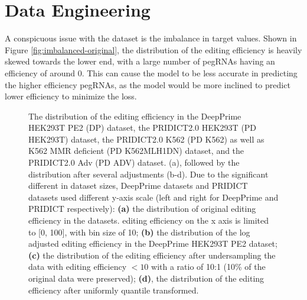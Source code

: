 \section{Data Engineering}
\label{sec:data-engineering}

A conspicuous issue with the dataset is the imbalance in target values. Shown in Figure \ref{fig:imbalanced-original}, the distribution of the editing efficiency is heavily skewed towards the lower end, with a large number of pegRNAs having an efficiency of around 0. This can cause the model to be less accurate in predicting the higher efficiency pegRNAs, as the model would be more inclined to predict lower efficiency to minimize the loss. 

\begin{figure}
    \centering
    \label{fig:imbalanced}
    \caption[Target Distribution Imbalance]{The distribution of the editing efficiency in the DeepPrime HEK293T PE2 (DP) dataset, the PRIDICT2.0 HEK293T (PD HEK293T) dataset, the PRIDICT2.0 K562 (PD K562) as well as K562 MMR deficient (PD K562MLH1DN) dataset, and the PRIDICT2.0 Adv (PD ADV) dataset. (a), followed by the distribution after several adjustments (b-d). Due to the significant different in dataset sizes, DeepPrime datasets and PRIDICT datasets used different y-axis scale (left and right for DeepPrime and PRIDICT respectively): 
    \textbf{(a)} the distribution of original editing efficiency in the datasets. editing efficiency on the x axis is limited to [0, 100], with bin size of 10; \textbf{(b)} the distribution of the log adjusted editing efficiency in the DeepPrime HEK293T PE2 dataset; \textbf{(c)} the distribution of the editing efficiency after undersampling the data with editing efficiency $<10$ with a ratio of 10:1 (10\% of the original data were preserved); \textbf{(d)}, the distribution of the editing efficiency after uniformly quantile transformed.}
\end{figure}

